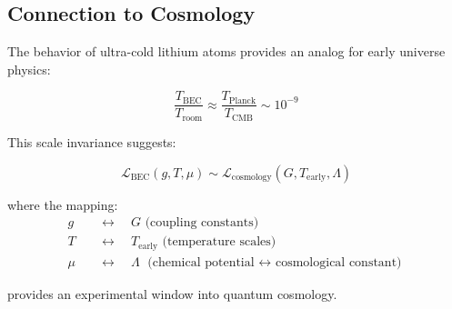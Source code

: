 \subsection{Connection to Cosmology}

The behavior of ultra-cold lithium atoms provides an analog for early universe physics:

\begin{equation}
\label{eq:cosmological_analogy}
\frac{T_{\text{BEC}}}{T_{\text{room}}} \approx \frac{T_{\text{Planck}}}{T_{\text{CMB}}} \sim 10^{-9}
\end{equation}

This scale invariance suggests:

\begin{equation}
\label{eq:scale_invariance}
\mathcal{L}_{\text{BEC}}(g, T, \mu) \sim \mathcal{L}_{\text{cosmology}}(G, T_{\text{early}}, \Lambda)
\end{equation}

where the mapping:
\begin{align}
g \quad &\leftrightarrow \quad G \text{ (coupling constants)} \\
T \quad &\leftrightarrow \quad T_{\text{early}} \text{ (temperature scales)} \\
\mu \quad &\leftrightarrow \quad \Lambda \text{ (chemical potential $\leftrightarrow$ cosmological constant)}
\end{align}

provides an experimental window into quantum cosmology.
